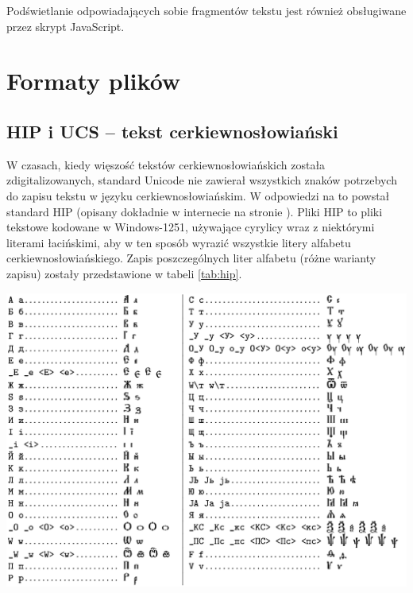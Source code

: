 \documentclass{pracamgr}
\begin{document}
Podświetlanie odpowiadających sobie fragmentów tekstu jest również
obsługiwane przez skrypt JavaScript.


\appendix
\chapter{Formaty plików}

\section{HIP i UCS -- tekst cerkiewno\-{}słowiański}
\label{encoding}

W czasach, kiedy więszość tekstów cerkiewno\-{}słowiańskich została
zdigitalizowanych, standard Unicode nie zawierał wszystkich znaków
potrzebych do zapisu tekstu w języku cerkiewno\-{}słowiańskim. W
odpowiedzi na to powstał standard HIP (opisany dokładnie w internecie
na stronie \cite{hip}). Pliki HIP to pliki tekstowe kodowane w
Windows-1251, używające cyrylicy wraz z niektórymi literami
łacińskimi, aby w ten sposób wyrazić wszystkie litery alfabetu
cerkiewno\-{}słowiańskiego. Zapis poszczególnych liter alfabetu (różne
warianty zapisu) zostały przedstawione w tabeli \ref{tab:hip}.

\begin{table}[ht!]
  \caption{Kodowanie znaków cerkiewno\-{}słowiańskich w standardzie HIP}
  \centering
    \includegraphics[width=\textwidth]{HIP-tabelka.png}
    \label{tab:hip}
\end{table}
\end{document}
